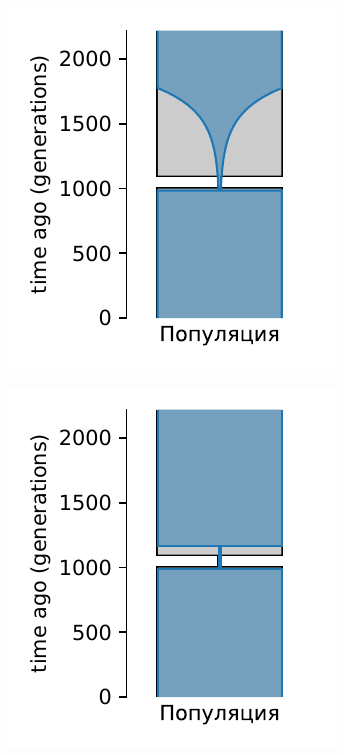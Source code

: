 \begin{figure}[ht]
    \centering
    \begin{subfigure}[b]{.33\textwidth}
    \includegraphics[width=\textwidth]{images_experiments/simulation_1/1pop/picture_1pop_model_2_ga_1_over.pdf}
    \caption{}
    \label{fig:part2:experiments:simulated_1:results_model_2_1}
    \end{subfigure}%
    \begin{subfigure}[b]{.33\textwidth}
    \includegraphics[width=\textwidth]{images_experiments/simulation_1/1pop/picture_1pop_model_2_ga_2_over.pdf}

\end{subfigure}
\end{figure}
